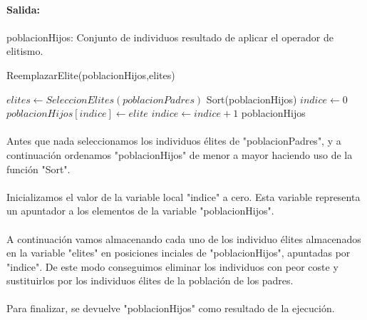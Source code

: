 	\paragraph{Salida:}
	
	\paragraph{}poblacionHijos: Conjunto de individuos resultado de aplicar el operador de elitismo.

	\begin{algorithm}[H]
		\caption{ReemplazarElite(poblacionHijos,elites)}
		\begin{algorithmic}
			\STATE $elites \leftarrow SeleccionElites(poblacionPadres)$
			\STATE Sort(poblacionHijos)
			\STATE $indice \leftarrow 0$
			\STATE $poblacionHijos[indice] \leftarrow elite$
			\STATE $indice \leftarrow indice+1$
			\ENDFOR
			\RETURN poblacionHijos
		\end{algorithmic}
	\end{algorithm}

	\paragraph{}Antes que nada seleccionamos los individuos élites de "poblacionPadres", y a continuación ordenamos "poblacionHijos" de menor a mayor haciendo uso de la función "Sort".
	
	\paragraph{}Inicializamos el valor de la variable local "indice" a cero. Esta variable representa un apuntador a los elementos de la variable "poblacionHijos".
	
	\paragraph{}A continuación vamos almacenando cada uno de los individuo élites almacenados en la variable "elites" en posiciones inciales de "poblacionHijos", apuntadas por "indice". De este modo conseguimos eliminar los individuos con peor coste y sustituirlos por los individuos élites de la población de los padres.
	
	\paragraph{}Para finalizar, se devuelve "poblacionHijos" como resultado de la ejecución.
	
	\newpage
	